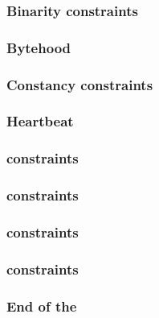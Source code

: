 \subsubsection{Binarity constraints}                            \label{rom: generalities: binarities}                 
\subsubsection{Bytehood}                                        \label{rom: generalities: bytehood}                   
\subsubsection{Constancy constraints}                           \label{rom: generalities: constancies}                
\subsubsection{Heartbeat}                                       \label{rom: generalities: heartbeat}                         
\subsubsection{\romColumnProgramCounter{} constraints}          \label{rom: generalities: program counter}            
\subsubsection{\romColumnPadding{} constraints}                 \label{rom: generalities: code size reached}          
\subsubsection{\romColumnLimbByteSize{} constraints}            \label{rom: generalities: nBytes}                     
\subsubsection{\romColumnLimbIndex{} constraints}                            \label{rom: generalities: index}                      
\subsubsection{End of the \cfi{}}                               \label{rom: generalities: end of cfi}                 
